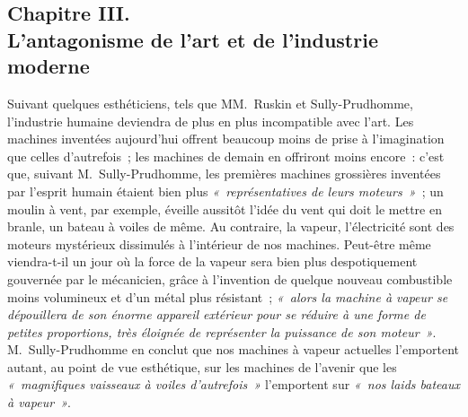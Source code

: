 \documentclass[french,twoside]{book} %
\begin{document}
\subsection[{Chapitre III. L’antagonisme de l’art et de l’industrie moderne}]{Chapitre III. \\
L’antagonisme de l’art et de l’industrie moderne}
\noindent  Suivant quelques esthéticiens, tels que MM. Ruskin et Sully-Prudhomme, l’industrie humaine deviendra de plus en plus incompatible avec l’art. Les machines inventées aujourd’hui offrent beaucoup moins de prise à l’imagination que celles d’autrefois ; les machines de demain en offriront moins encore : c’est que, suivant M. Sully-Prudhomme, les premières machines grossières inventées par l’esprit humain étaient bien plus \emph{« représentatives de leurs moteurs »} ; un moulin à vent, par exemple, éveille aussitôt l’idée du vent qui doit le mettre en branle, un bateau à voiles de même. Au contraire, la vapeur, l’électricité sont des moteurs mystérieux dissimulés à l’intérieur de nos machines. Peut-être même viendra-t-il un jour où la force de la vapeur sera bien plus despotiquement gouvernée par le mécanicien, grâce à l’invention de quelque nouveau combustible moins volumineux et d’un métal plus résistant ; \emph{« alors la machine à vapeur se dépouillera de son énorme appareil extérieur pour se réduire à une forme de petites  proportions, très éloignée de représenter la puissance de son moteur »}. M. Sully-Prudhomme en conclut que nos machines à vapeur actuelles l’emportent autant, au point de vue esthétique, sur les machines de l’avenir que les \emph{« magnifiques vaisseaux à voiles d’autrefois »} l’emportent sur \emph{« nos laids bateaux à vapeur »}.\par
\end{document}
